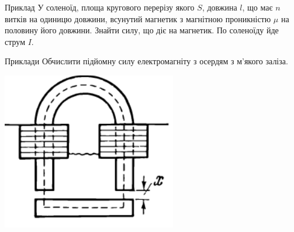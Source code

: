 \documentclass{beamer}
\begin{document}
\begin{frame}[t]{Приклад}{}
       У соленоїд, площа кругового перерізу якого $ S $, довжина $ l $, що має $ n $ витків на одиницю довжини, всунутий магнетик з магнітною
       проникністю $ \mu $ на половину його довжини. Знайти силу, що діє на магнетик. По соленоїду йде струм $ I  $.
\end{frame}





\begin{frame}[t]{Приклади}{}
Обчислити підйомну силу електромагніту з осердям з м'якого заліза.
\begin{flushright}
\includegraphics[width=0.5\linewidth]{magnet}
\end{flushright}
\end{frame}
\end{document}
